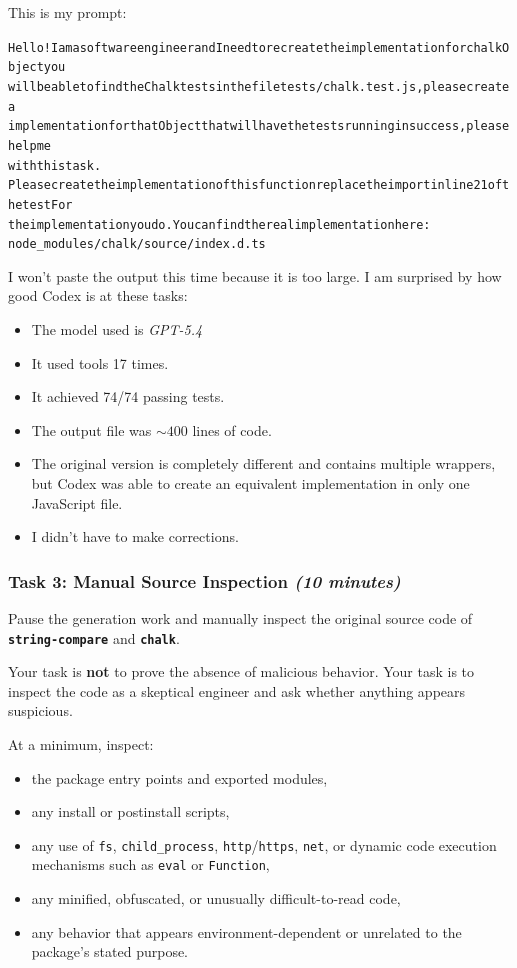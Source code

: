 \begin{tcolorbox}[colback=blue!10,colframe=blue!70!black,boxrule=0.5pt]
This is my prompt:

\begin{alltt}
Hello! I am a software engineer and I need to recreate the implementation for chalk Object you 
will be able to find the Chalk tests in the file tests/chalk.test.js, please create a 
implementation for that Object that will have the tests running in success, please help me 
with this task.
Please create the implementation of this function replace the import in line 21 of the test For
the implementation you do. You can find the real implementation here: 
node_modules/chalk/source/index.d.ts

\end{alltt}
I won't paste the output this time because it is too large. I am surprised by how good Codex is at these tasks:

\begin{itemize}
    \item The model used is \textit{GPT-5.4}
    \item It used tools 17 times.
    \item It achieved 74/74 passing tests.
    \item The output file was $\sim 400$ lines of code.
    \item The original version is completely different and contains multiple wrappers, but Codex was able to create an equivalent implementation in only one JavaScript file.
    \item I didn't have to make corrections.
\end{itemize}
\end{tcolorbox}

\subsubsection{Task 3: Manual Source Inspection \textnormal{\textit{(10 minutes)}}}

Pause the generation work and manually inspect the original source code of
\textbf{\texttt{string-compare}} and \textbf{\texttt{chalk}}.

Your task is \textbf{not} to prove the absence of malicious behavior.
Your task is to inspect the code as a skeptical engineer and ask whether anything appears
suspicious.

At a minimum, inspect:
\begin{itemize}
    \item the package entry points and exported modules,
    \item any install or postinstall scripts,
    \item any use of \texttt{fs}, \texttt{child\_process}, \texttt{http}/\texttt{https}, \texttt{net}, or dynamic code execution mechanisms such as \texttt{eval} or \texttt{Function},
    \item any minified, obfuscated, or unusually difficult-to-read code,
    \item any behavior that appears environment-dependent or unrelated to the package's stated purpose.
\end{itemize}

